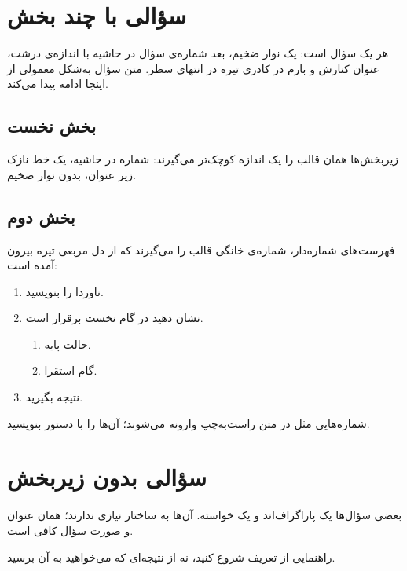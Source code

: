 \section{سؤالی با چند بخش }

هر  یک سؤال است: یک نوار ضخیم، بعد شماره‌ی سؤال در
حاشیه با اندازه‌ی درشت، عنوان کنارش و بارم در کادری تیره در انتهای سطر. متن
سؤال به‌شکل معمولی از اینجا ادامه پیدا می‌کند.


\subsection{بخش نخست}

زیربخش‌ها همان قالب را یک اندازه کوچک‌تر می‌گیرند: شماره در حاشیه، یک خط نازک
زیر عنوان، بدون نوار ضخیم.

\subsection{بخش دوم}

فهرست‌های شماره‌دار، شماره‌ی خانگی قالب را می‌گیرند که از دل مربعی تیره
بیرون آمده است:

\begin{enumerate}
    \item ناوردا را بنویسید.
    \item نشان دهید در گام نخست برقرار است.
        \begin{enumerate}
            \item حالت پایه.
            \item گام استقرا.
        \end{enumerate}
    \item نتیجه بگیرید.
\end{enumerate}

شماره‌هایی مثل  در متن راست‌به‌چپ وارونه می‌شوند؛ آن‌ها را با
دستور  بنویسید.

\section{سؤالی بدون زیربخش }

بعضی سؤال‌ها یک پاراگراف‌اند و یک خواسته. آن‌ها به ساختار نیازی ندارند؛ همان
عنوان و صورت سؤال کافی است.

\begin{asidebox}{راهنمایی}
    از تعریف شروع کنید، نه از نتیجه‌ای که می‌خواهید به آن برسید.
\end{asidebox}
